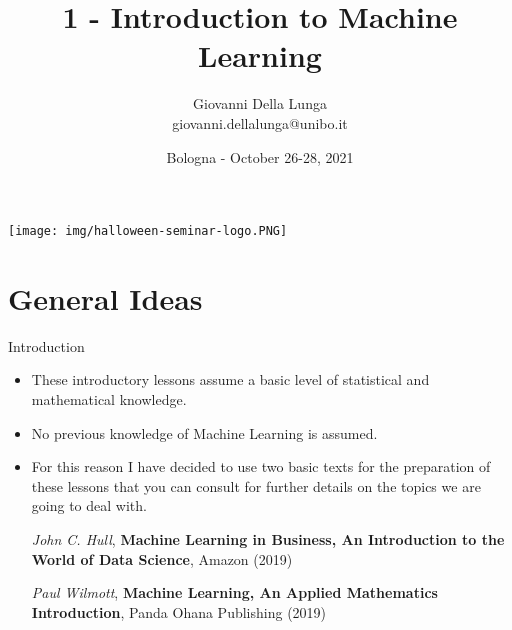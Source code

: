 \documentclass[11pt]{beamer}
\author{Giovanni Della Lunga\\{\footnotesize giovanni.dellalunga@unibo.it}}
\title{1 - Introduction to Machine Learning}
\subtitle{} %
\institute{Halloween Conference in Quantitative Finance}
\date{Bologna - October 26-28, 2021}
\begin{document}
\begin{frame}
\texttt{[image: img/halloween-seminar-logo.PNG]}
\end{frame}

\begin{frame}
\titlepage
\end{frame}

\AtBeginSubsection{\frame{\subsectionpage}}


\section{General Ideas}

\begin{frame}{Introduction}
\begin{itemize}
\item These introductory lessons assume a basic level of statistical and mathematical knowledge. 
\item No previous knowledge of Machine Learning is assumed. 
\item For this reason I have decided to use two basic texts for the preparation of these lessons that you can consult for further details on the topics we are going to deal with.

\vspace{0.5cm}
\textit{John C. Hull}, \textbf{Machine Learning in Business, An Introduction to the World of Data Science}, Amazon (2019)

\vspace{0.5cm}
\textit{Paul Wilmott}, \textbf{Machine Learning, An Applied Mathematics Introduction}, Panda Ohana Publishing (2019)


\end{itemize}
\end{frame}
%
\end{document}
